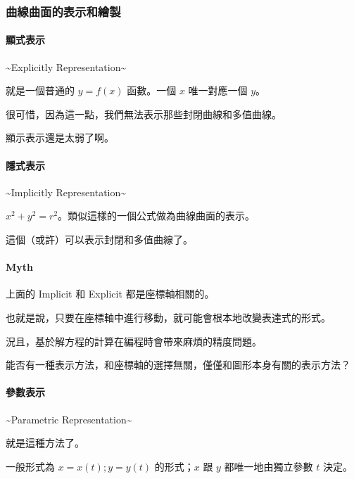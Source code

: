 \documentclass[
]{article}
\begin{document}
\hypertarget{header-n116}{%
\subsubsection{曲線曲面的表示和繪製}\label{header-n116}}

\hypertarget{header-n117}{%
\paragraph{顯式表示}\label{header-n117}}

\textasciitilde Explicitly Representation\textasciitilde{}

就是一個普通的 \(y = f(x)\) 函數。一個 \(x\) 唯一對應一個 \(y\)。

很可惜，因為這一點，我們無法表示那些封閉曲線和多值曲線。

顯示表示還是太弱了啊。

\hypertarget{header-n122}{%
\paragraph{隱式表示}\label{header-n122}}

\textasciitilde Implicitly Representation\textasciitilde{}

\(x ^ 2 + y ^ 2 = r ^ 2\)。類似這樣的一個公式做為曲線曲面的表示。

這個（或許）可以表示封閉和多值曲線了。

\hypertarget{header-n126}{%
\paragraph{Myth}\label{header-n126}}

上面的 Implicit 和 Explicit 都是座標軸相關的。

也就是說，只要在座標軸中進行移動，就可能會根本地改變表達式的形式。

況且，基於解方程的計算在編程時會帶來麻煩的精度問題。

能否有一種表示方法，和座標軸的選擇無關，僅僅和圖形本身有關的表示方法？

\hypertarget{header-n131}{%
\paragraph{參數表示}\label{header-n131}}

\textasciitilde Parametric Representation\textasciitilde{}

就是這種方法了。

一般形式為 \(x = x(t); y = y(t)\) 的形式；\(x\) 跟 \(y\)
都唯一地由獨立參數 \(t\) 決定。
\end{document}
